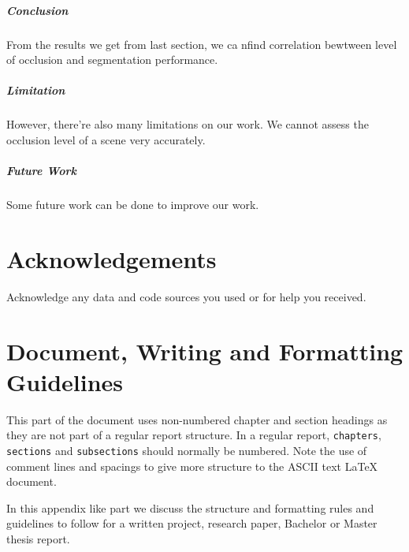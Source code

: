 \documentclass[11pt, a4paper,oneside,chapterprefix=false]{scrbook}
\begin{document}
\paragraph{Conclusion}

From the results we get from last section, we ca nfind correlation bewtween level of occlusion and segmentation performance.

\paragraph{Limitation}

However, there're also many limitations on our work. We cannot assess the occlusion level of a scene very accurately.

\paragraph{Future Work}

Some future work can be done to improve our work.

\chapter{Acknowledgements} \label{chp:acknowledgements}

Acknowledge any data and code sources you used or for help you received.


\chapter*{Document, Writing and Formatting Guidelines}

This part of the document uses non-numbered chapter and section headings as they are not part of a regular report structure. In a regular report, \texttt{chapters}, \texttt{sections} and \texttt{subsections} should normally be numbered. Note the use of comment lines and spacings to give more structure to the ASCII text LaTeX document.

In this appendix like part we discuss the structure and formatting rules and guidelines to follow for a written project, research paper, Bachelor or Master thesis report.

\end{document}
